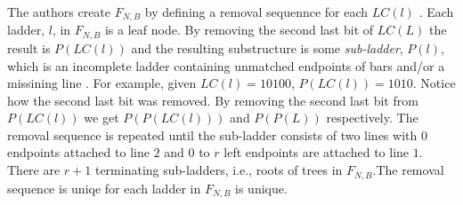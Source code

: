 The authors create $F_{N,B}$ by defining a removal sequennce for 
each $LC(l)$ \cite{A6}. Each ladder, $l$, in 
$F_{N,B}$ is a leaf node. By removing the second last bit of $LC(L)$ the result 
is $P(LC(l))$ and the resulting substructure is some \emph{sub-ladder}, $P(l)$, which 
is an incomplete ladder containing unmatched endpoints of bars and/or a missining line \cite{A6}. For example, 
given $LC(l)=10100$, $P(LC(l))=1010$. Notice how the second last bit was removed. 
By removing the second last bit from $P(LC(l))$ we get $P(P(LC(l)))$ and $P(P(L))$ respectively.
The removal sequence is repeated until the sub-ladder consists of two lines with $0$ endpoints
attached to line $2$ and $0$ to $r$ left endpoints are attached to line $1$. There are $r+1$
terminating sub-ladders, i.e., roots of trees in $F_{N,B}$.The removal sequence is uniqe for each ladder in $F_{N,B}$ is unique.\par
